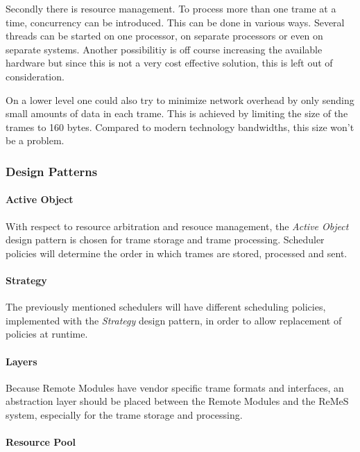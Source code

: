 \npar Secondly there is resource management. To process more than one trame at a
time, concurrency can be introduced. This can be done in various ways. Several
threads can be started on one processor, on separate processors or even on
separate systems. Another possibilitiy is off course increasing the available
hardware but since this is not a very cost effective solution, this is left out
of consideration.

\npar On a lower level one could also try to minimize network overhead by
only sending small amounts of data in each trame. This is achieved by
limiting the size of the trames to 160 bytes. Compared to modern technology
bandwidths, this size won't be a problem. 

\subsubsection{Design Patterns}
\label{add:it1/patterns}

\paragraph{Active Object}

\npar With respect to resource arbitration and resouce management, the
\emph{Active Object} design pattern \citep[see][p.~365q]{Buschmann:07} is chosen
for trame storage and trame processing. Scheduler policies will determine the
order in which trames are stored, processed and sent.

\paragraph{Strategy}

\npar The previously mentioned schedulers will have different scheduling
policies, implemented with the \emph{Strategy} design pattern, in order to
allow replacement of policies at runtime.

\paragraph{Layers}

\npar Because Remote Modules have vendor specific trame formats and interfaces,
an abstraction layer should be placed between the Remote Modules and the ReMeS
system, especially for the trame storage and processing.

\paragraph{Resource Pool}

